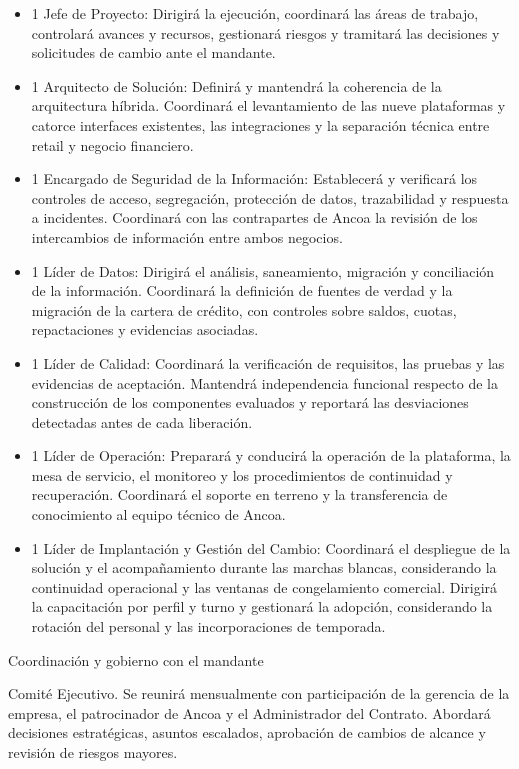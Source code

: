 \documentclass[11pt]{article}
\providecommand{\tightlist}{%
  \setlength{\itemsep}{0pt}\setlength{\parskip}{0pt}}
\begin{document}
\begin{itemize}
\tightlist
\item
  1 Jefe de Proyecto: Dirigirá la ejecución, coordinará las áreas de trabajo, controlará avances y recursos, gestionará riesgos y tramitará las decisiones y solicitudes de cambio ante el mandante.
\item
  1 Arquitecto de Solución: Definirá y mantendrá la coherencia de la arquitectura híbrida. Coordinará el levantamiento de las nueve plataformas y catorce interfaces existentes, las integraciones y la separación técnica entre retail y negocio financiero.
\item
  1 Encargado de Seguridad de la Información: Establecerá y verificará los controles de acceso, segregación, protección de datos, trazabilidad y respuesta a incidentes. Coordinará con las contrapartes de Ancoa la revisión de los intercambios de información entre ambos negocios.
\item
  1 Líder de Datos: Dirigirá el análisis, saneamiento, migración y conciliación de la información. Coordinará la definición de fuentes de verdad y la migración de la cartera de crédito, con controles sobre saldos, cuotas, repactaciones y evidencias asociadas.
\item
  1 Líder de Calidad: Coordinará la verificación de requisitos, las pruebas y las evidencias de aceptación. Mantendrá independencia funcional respecto de la construcción de los componentes evaluados y reportará las desviaciones detectadas antes de cada liberación.
\item
  1 Líder de Operación: Preparará y conducirá la operación de la plataforma, la mesa de servicio, el monitoreo y los procedimientos de continuidad y recuperación. Coordinará el soporte en terreno y la transferencia de conocimiento al equipo técnico de Ancoa.
\item
  1 Líder de Implantación y Gestión del Cambio: Coordinará el despliegue de la solución y el acompañamiento durante las marchas blancas, considerando la continuidad operacional y las ventanas de congelamiento comercial. Dirigirá la capacitación por perfil y turno y gestionará la adopción, considerando la rotación del personal y las incorporaciones de temporada.
\end{itemize}

Coordinación y gobierno con el mandante

Comité Ejecutivo. Se reunirá mensualmente con participación de la gerencia de la empresa, el patrocinador de Ancoa y el Administrador del Contrato. Abordará decisiones estratégicas, asuntos escalados, aprobación de cambios de alcance y revisión de riesgos mayores.
\end{document}
